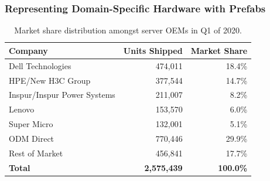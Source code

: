 \documentclass[11pt]{article}
\begin{document}
		\subsubsection{Representing Domain-Specific Hardware with Prefabs}
			\begin{table}[]
			\centering
				\begin{tabular}{lrr}
				\toprule
				Company                     & Units Shipped      & Market Share     \\ \midrule
				\rowcolor[HTML]{9AFF99} 
				Dell Technologies           & 474,011            & 18.4\%           \\
				\rowcolor[HTML]{9AFF99} 
				HPE/New H3C Group           & 377,544            & 14.7\%           \\
				\rowcolor[HTML]{9AFF99} 
				Inspur/Inspur Power Systems & 211,007            & 8.2\%            \\
				Lenovo                      & 153,570            & 6.0\%            \\
				Super Micro                 & 132,001            & 5.1\%            \\
				ODM Direct                  & 770,446            & 29.9\%           \\
				Rest of Market              & 456,841            & 17.7\%           \\ \midrule
				\textbf{Total}              & \textbf{2,575,439} & \textbf{100.0\%} \\ \bottomrule
				\end{tabular}
			\caption[Market share distribution amongst server OEMs in Q1 of 2020]{Market share distribution amongst server OEMs in Q1 of 2020.}
			\label{tab:1}
			\end{table}
\end{document}
